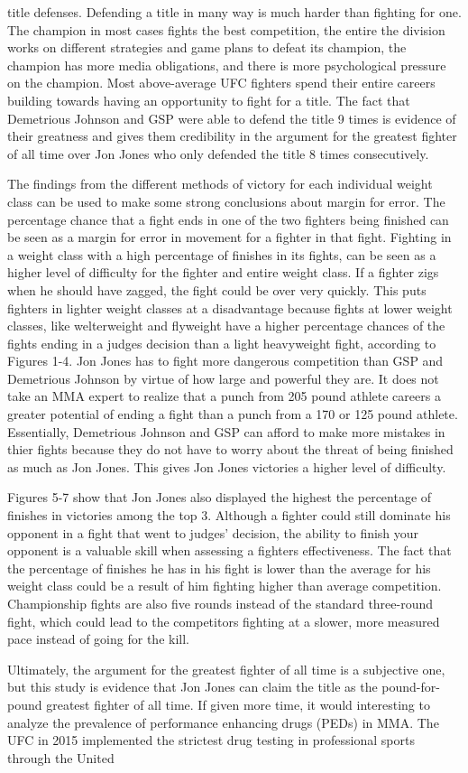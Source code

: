 \documentclass[12pt,english]{report}
\begin{document}
title defenses. Defending a title in many way is much harder than fighting for one. The champion in most cases fights the best competition, the entire the division works on different strategies and game plans to defeat its champion, the champion has more media obligations, and there is more psychological pressure on the champion. \cite{martin_2013} Most above-average UFC fighters spend their entire careers building towards having an opportunity to fight for a title. The fact that Demetrious Johnson and GSP were able to defend the title 9 times is evidence of their greatness and gives them credibility in the argument for the greatest fighter of all time over Jon Jones who only defended the title 8 times consecutively. \cite{ryder_2018} \par The findings from the different methods of victory for each individual weight class can be used to make some strong conclusions about margin for error. The percentage chance that a fight ends in one of the two fighters being finished can be seen as a margin for error in movement for a fighter in that fight. Fighting in a weight class with a high percentage of finishes in its fights, can be seen as a higher level of difficulty for the fighter and entire weight class. If a fighter zigs when he should have zagged, the fight could be over very quickly. This puts fighters in lighter weight classes at a disadvantage because fights at lower weight classes, like welterweight and flyweight have a higher percentage chances of the fights ending in a judges decision than a light heavyweight fight, according to Figures 1-4. Jon Jones has to fight more dangerous competition than GSP and Demetrious Johnson by virtue of how large and powerful they are. It does not take an MMA expert to realize that a punch from 205 pound athlete careers a greater potential of ending a fight than a punch from a 170 or 125 pound athlete. Essentially, Demetrious Johnson and GSP can afford to make more mistakes in thier fights because they do not have to worry about the threat of being finished as much as Jon Jones. This gives Jon Jones victories a higher level of difficulty. \par Figures 5-7 show that Jon Jones also displayed the highest the percentage of finishes in victories among the top 3. Although a fighter could still dominate his opponent in a fight that went to judges' decision, the ability to finish your opponent is a valuable skill when assessing a fighters effectiveness. The fact that the percentage of finishes he has in his fight is lower than the average for his weight class could be a result of him fighting higher than average competition. Championship fights are also five rounds instead of the standard three-round fight, which could lead to the competitors fighting at a slower, more measured pace instead of going for the kill. \par Ultimately, the argument for the greatest fighter of all time is a subjective one, but this study is evidence that Jon Jones can claim the title as the pound-for-pound greatest fighter of all time. If given more time, it would interesting to analyze the prevalence of performance enhancing drugs (PEDs) in MMA. The UFC in 2015 implemented the strictest drug testing in professional sports through the United 
\end{document}
